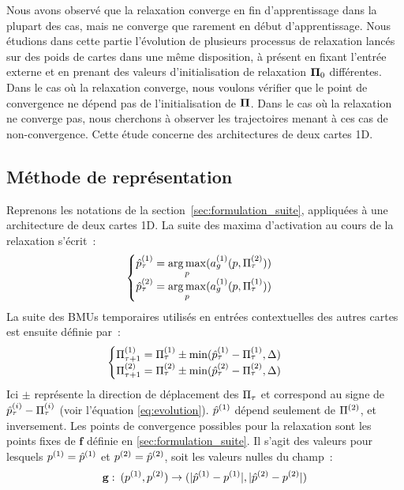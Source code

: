 \documentclass[../main]{subfiles}
\begin{document}
Nous avons observé que la relaxation converge en fin d'apprentissage dans la plupart des cas, mais ne converge que rarement en début d'apprentissage.
Nous étudions dans cette partie l'évolution de plusieurs processus de relaxation lancés sur des poids de cartes dans une même disposition, à présent en fixant l'entrée externe et en prenant des valeurs d'initialisation de relaxation $\mathbf{\Pi}_0$ différentes.
Dans le cas où la relaxation converge, nous voulons vérifier que le point de convergence ne dépend pas de l'initialisation de $\mathbf{\Pi}$.
Dans le cas où la relaxation ne converge pas, nous cherchons à observer les trajectoires menant à ces cas de non-convergence. Cette étude concerne des architectures de deux cartes 1D.

\subsection{Méthode de représentation\label{sec:relax_expe}}

Reprenons les notations de la section~\ref{sec:formulation_suite}, appliquées à une architecture de deux cartes 1D. La suite des maxima d'activation au cours de la relaxation s'écrit~:
\begin{equation*}
	\begin{cases}
	\hat{p}^{({1})}_\tau = \operatorname*{arg\,max}\limits_p(a_g^{({1})}(p, \Pi^{({2})}_\tau))\\
	\hat{p}^{({2})}_\tau = \operatorname*{arg\,max}\limits_p(a_g^{({1})}(p, \Pi^{({1})}_\tau)) \\
	\end{cases}
	\end{equation*}
La suite des BMUs temporaires utilisés en entrées contextuelles des autres cartes est ensuite définie par~:
\begin{align*}
	&\begin{cases}
	\Pi^{({1})}_{\tau+1} = \Pi^{({1})}_\tau \pm \min(\hat{p}^{({1})}_\tau - \Pi^{({1})}_\tau, \Delta)  \\
	\Pi^{({2})}_{\tau+1} = \Pi^{({2})}_\tau \pm \min(\hat{p}^{({2})}_\tau - \Pi^{({2})}_\tau, \Delta) \\
	\end{cases}
	\end{align*}
Ici $\pm$ représente la direction de déplacement des $\Pi_\tau$ et correspond au signe de $\hat{p}^{({i})}_\tau - \Pi^{({i})}_\tau$ (voir l'équation \ref{eq:evolution}).
$\hat{p}^{({1})}$ dépend seulement de $\Pi^{({2})}$, et inversement.
Les points de convergence possibles pour la relaxation sont les points fixes de $\mathbf{f}$ définie en \ref{sec:formulation_suite}. Il s'agit des valeurs pour lesquels $p^{({1})} = \hat{p}^{({1})}$ et $p^{({2})} = \hat{p}^{({2})}$, soit les valeurs nulles du champ~:
\begin{equation} 
	\mathbf{g}:\: (p^{({1})}, p^{({2})}) \rightarrow (\lvert \hat{p}^{({1})} - p^{({1})} \rvert,  \lvert \hat{p}^{({2})} - p^{({2})} \rvert)
\end{equation}
\end{document}
